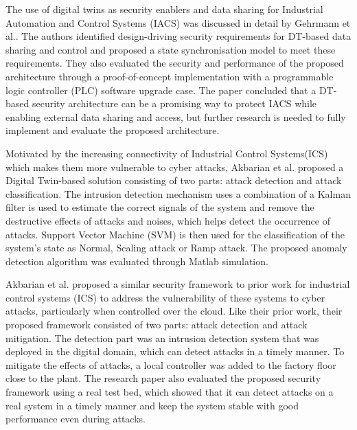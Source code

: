 The use of digital twins as security enablers and data sharing for Industrial Automation and Control Systems (IACS) was discussed in detail by Gehrmann et al.\cite{gehrmannDigitalTwinBased2020}. The authors identified design-driving security requirements for DT-based data sharing and control and proposed a state synchronisation model to meet these requirements. They also evaluated the security and performance of the proposed architecture through a proof-of-concept implementation with a programmable logic controller (PLC) software upgrade case. The paper concluded that a DT-based security architecture can be a promising way to protect IACS while enabling external data sharing and access, but further research is needed to fully implement and evaluate the proposed architecture.

Motivated by the increasing connectivity of Industrial Control Systems(ICS) which makes them more vulnerable to cyber attacks, Akbarian et al. \cite{akbarianIntrusionDetectionDigital2020} proposed a Digital Twin-based solution consisting of two parts: attack detection and attack classification. The intrusion detection mechanism uses a combination of a Kalman filter is used  to estimate the correct signals of the system and remove the destructive effects of attacks and noises, which helps detect the occurrence of attacks. Support Vector Machine (SVM) is then used for the classification of the system's state as Normal, Scaling attack or Ramp attack. The proposed anomaly detection algorithm was evaluated through Matlab simulation.

Akbarian et al.\cite{akbarianSecurityFrameworkDigital2021} proposed a similar security framework to prior work\cite{akbarianIntrusionDetectionDigital2020} for industrial control systems (ICS) to address the vulnerability of these systems to cyber attacks, particularly when controlled over the cloud. Like their prior work, their proposed framework consisted of two parts: attack detection and attack mitigation. The detection part was an intrusion detection system that was deployed in the digital domain, which can detect attacks in a timely manner. To mitigate the effects of attacks, a local controller was added to the factory floor close to the plant. The research paper also evaluated the proposed security framework using a real test bed, which showed that it can detect attacks on a real system in a timely manner and keep the system stable with good performance even during attacks.

